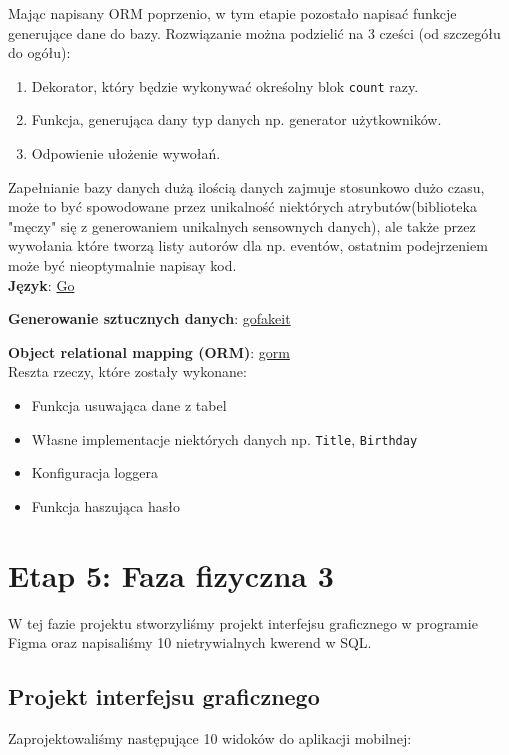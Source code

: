 \documentclass{article}
\begin{document}
\quad Mając napisany ORM poprzenio, w tym etapie pozostało napisać funkcje generujące dane do bazy. Rozwiązanie można podzielić na 3 cześci (od szczegółu do ogółu):

\begin{enumerate}
    \item Dekorator, który będzie wykonywać okreśolny blok \texttt{count} razy.
    \item Funkcja, generująca dany typ danych np. generator użytkowników.
    \item Odpowienie ułożenie wywołań.
\end{enumerate}

Zapełnianie bazy danych dużą ilością danych zajmuje stosunkowo dużo czasu, może to być spowodowane przez unikalność niektórych atrybutów(biblioteka "męczy" się z generowaniem unikalnych sensownych danych), ale także przez wywołania które tworzą listy autorów dla np. eventów, ostatnim podejrzeniem może być nieoptymalnie napisay kod. \\ 


\textbf{Język}: \href{https://go.dev/}{Go} 

\textbf{Generowanie sztucznych danych}: \href{https://github.com/brianvoe/gofakeit}{gofakeit} 

\textbf{Object relational mapping (ORM)}: \href{https://github.com/go-gorm/gorm}{gorm} \\

Reszta rzeczy, które zostały wykonane:

\begin{itemize}
    \item Funkcja usuwająca dane z tabel
    \item Własne implementacje niektórych danych np. \texttt{Title}, \texttt{Birthday} 
    \item Konfiguracja loggera 
    \item Funkcja haszująca hasło 
\end{itemize}

\section{Etap 5: Faza fizyczna 3}

\quad W tej fazie projektu stworzyliśmy projekt interfejsu graficznego w programie Figma oraz napisaliśmy 10 nietrywialnych kwerend w SQL.

\subsection{Projekt interfejsu graficznego}
\quad Zaprojektowaliśmy następujące 10 widoków do aplikacji mobilnej: 
\end{document}
